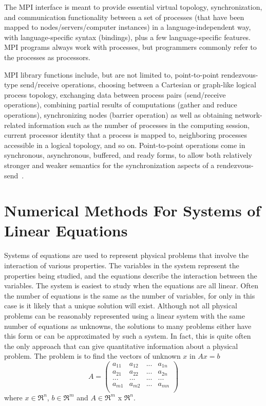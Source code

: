 The MPI interface is meant to provide essential virtual topology, 
synchronization, and communication functionality between a set of processes 
(that have been mapped to nodes/servers/computer instances) in a 
language-independent way, with language-specific syntax (bindings), plus a few 
language-specific features. MPI programs always work with processes, but 
programmers commonly refer to the processes as processors. 

MPI library functions include, but are not limited to, point-to-point 
rendezvous-type send/receive operations, choosing between a Cartesian or 
graph-like logical process topology, exchanging data between process pairs 
(send/receive operations), combining partial results of computations (gather and 
reduce operations), synchronizing nodes (barrier operation) as well as obtaining 
network-related information such as the number of processes in the computing 
session, current processor identity that a process is mapped to, neighboring 
processes accessible in a logical topology, and so on. Point-to-point operations 
come in synchronous, asynchronous, buffered, and ready forms, to allow both 
relatively stronger and weaker semantics for the synchronization aspects of a 
rendezvous-send~\cite{wiki_mpi}.

\section{Numerical Methods For Systems of Linear Equations}
\label{sec:solvers}
Systems of equations are used to represent physical problems that involve the 
interaction of various properties. The variables in the system represent the 
properties being studied, and the equations describe the interaction between the 
variables. The system is easiest to study when the equations are all linear.  
Often the number of equations is the same as the number of variables, for only 
in this case is it likely that a unique solution will exist. Although not all 
physical problems can be reasonably represented using a linear system with the 
same number of equations as unknowns, the solutions to many problems either have 
this form or can be approximated by such a system. In fact, this is quite often 
the only approach that can give quantitative information about a physical 
problem. The problem is to find the vectors of unknown $x$ in $Ax = b$
$$
A=
\begin{pmatrix}
    a_{11}&a_{12}&...&a_{1n}\\
    a_{21}&a_{22}&...&a_{2n}\\
    ...&...&...&...\\
    a_{m1}&a_{m2}&...&a_{mn}\\
\end{pmatrix}
$$
where $x \in \Re^n$, $b \in \Re^m$ and $A \in \Re^m$ x $\Re^n$.

